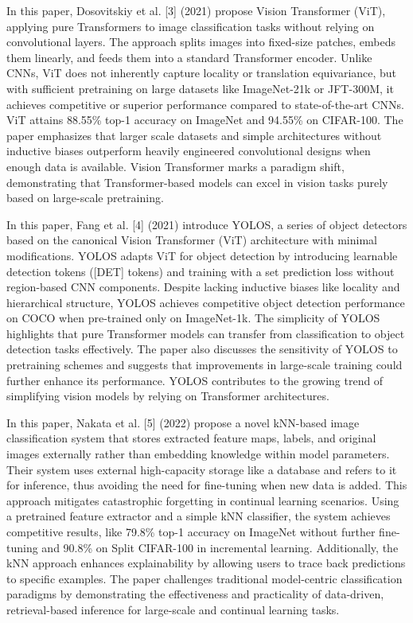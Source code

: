 In this paper, Dosovitskiy et al. [3] (2021) propose Vision Transformer (ViT), applying pure Transformers to image classification tasks without relying on convolutional layers. The approach splits images into fixed-size patches, embeds them linearly, and feeds them into a standard Transformer encoder. Unlike CNNs, ViT does not inherently capture locality or translation equivariance, but with sufficient pretraining on large datasets like ImageNet-21k or JFT-300M, it achieves competitive or superior performance compared to state-of-the-art CNNs. ViT attains 88.55\% top-1 accuracy on ImageNet and 94.55\% on CIFAR-100. The paper emphasizes that larger scale datasets and simple architectures without inductive biases outperform heavily engineered convolutional designs when enough data is available. Vision Transformer marks a paradigm shift, demonstrating that Transformer-based models can excel in vision tasks purely based on large-scale pretraining.


In this paper, Fang et al. [4] (2021) introduce YOLOS, a series of object detectors based on the canonical Vision Transformer (ViT) architecture with minimal modifications. YOLOS adapts ViT for object detection by introducing learnable detection tokens ([DET] tokens) and training with a set prediction loss without region-based CNN components. Despite lacking inductive biases like locality and hierarchical structure, YOLOS achieves competitive object detection performance on COCO when pre-trained only on ImageNet-1k. The simplicity of YOLOS highlights that pure Transformer models can transfer from classification to object detection tasks effectively. The paper also discusses the sensitivity of YOLOS to pretraining schemes and suggests that improvements in large-scale training could further enhance its performance. YOLOS contributes to the growing trend of simplifying vision models by relying on Transformer architectures.


In this paper, Nakata et al. [5] (2022) propose a novel kNN-based image classification system that stores extracted feature maps, labels, and original images externally rather than embedding knowledge within model parameters. Their system uses external high-capacity storage like a database and refers to it for inference, thus avoiding the need for fine-tuning when new data is added. This approach mitigates catastrophic forgetting in continual learning scenarios. Using a pretrained feature extractor and a simple kNN classifier, the system achieves competitive results, like 79.8\% top-1 accuracy on ImageNet without further fine-tuning and 90.8\% on Split CIFAR-100 in incremental learning. Additionally, the kNN approach enhances explainability by allowing users to trace back predictions to specific examples. The paper challenges traditional model-centric classification paradigms by demonstrating the effectiveness and practicality of data-driven, retrieval-based inference for large-scale and continual learning tasks.


